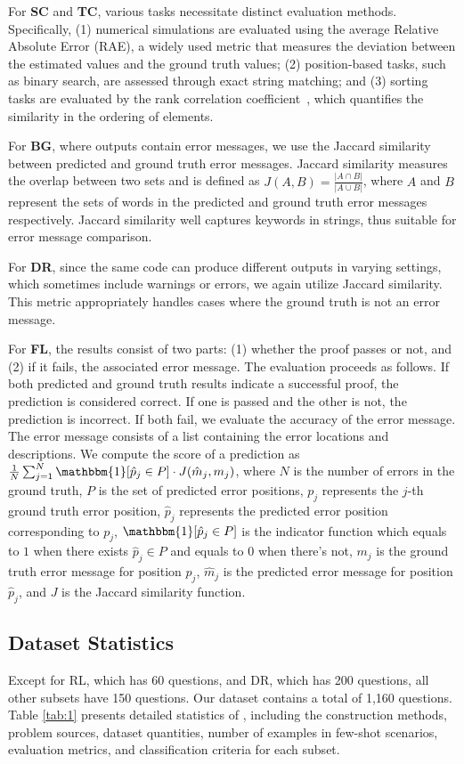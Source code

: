 For \textbf{SC} and \textbf{TC}, various tasks necessitate distinct evaluation methods. Specifically, (1) numerical simulations are evaluated using the average Relative Absolute Error (RAE), a widely used metric that measures the deviation between the estimated values and the ground truth values; (2) position-based tasks, such as binary search, are assessed through exact string matching; and (3) sorting tasks are evaluated by the rank correlation coefficient~\citep{spearman1904proof}, which quantifies the similarity in the ordering of elements.

For \textbf{BG}, where outputs contain error messages, we use the Jaccard similarity~\citep{jaccard1901etude} between predicted and ground truth error messages. Jaccard similarity measures the overlap between two sets and is defined as $J(A, B) = \frac{|A \cap B|}{|A \cup B|}$, where \( A \) and \( B \) represent the sets of words in the predicted and ground truth error messages respectively. Jaccard similarity well captures keywords in strings, thus suitable for error message comparison.

For \textbf{DR}, since the same code can produce different outputs in varying settings, which sometimes include warnings or errors, we again utilize Jaccard similarity. This metric appropriately handles cases where the ground truth is not an error message.


For \textbf{FL}, the results consist of two parts: (1) whether the proof passes or not, and (2) if it fails, the associated error message. The evaluation proceeds as follows. If both predicted and ground truth results indicate a successful proof, the prediction is considered correct. If one is passed and the other is not, the prediction is incorrect. If both fail, we evaluate the accuracy of the error message. The error message consists of a list containing the error locations and descriptions. We compute the score of a prediction as $\frac{1}{N} \sum_{j=1}^{N} \mathbbm{1}[{\hat{p}_j \in P}] \cdot J(\hat{m}_j, m_j)$, where \( N \) is the number of errors in the ground truth, \( P \) is the set of predicted error positions, \( p_j \) represents the \( j \)-th ground truth error position, \( \hat{p}_j \) represents the predicted error position corresponding to \( p_j \), $\mathbbm{1}[{\hat{p}_j \in P}]$ is the indicator function which equals to $1$ when there exists $\hat{p}_j \in P$ and equals to $0$ when there's not, \( m_j \) is the ground truth error message for position \( p_j \), \( \hat{m}_j \) is the predicted error message for position \( \hat{p}_j \), and \( J\) is the Jaccard similarity function.

\subsection{Dataset Statistics}

Except for RL, which has 60 questions, and DR, which has 200 questions, all other subsets have 150 questions. Our dataset contains a total of 1,160 questions. Table \ref{tab:1} presents detailed statistics of \bench, including the construction methods, problem sources, dataset quantities, number of examples in few-shot scenarios, evaluation metrics, and classification criteria for each subset.

